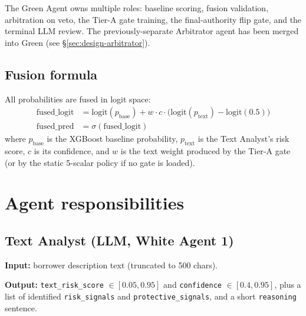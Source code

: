 \documentclass[11pt,a4paper]{article}
\begin{document}
\noindent
The Green Agent owns multiple roles: baseline scoring, fusion validation,
arbitration on veto, the Tier-A gate training, the final-authority flip gate,
and the terminal LLM review. The previously-separate Arbitrator agent has been
merged into Green (see \S\ref{sec:design-arbitrator}).

\subsection{Fusion formula}

All probabilities are fused in logit space:
\begin{align*}
\mathrm{fused\_logit} &= \mathrm{logit}(p_{\mathrm{base}})
                       + w \cdot c \cdot \bigl(\mathrm{logit}(p_{\mathrm{text}}) - \mathrm{logit}(0.5)\bigr) \\
\mathrm{fused\_pred}  &= \sigma(\mathrm{fused\_logit})
\end{align*}
where $p_{\mathrm{base}}$ is the XGBoost baseline probability, $p_{\mathrm{text}}$
is the Text Analyst's risk score, $c$ is its confidence, and $w$ is the text weight
produced by the Tier-A gate (or by the static 5-scalar policy if no gate is loaded).

\section{Agent responsibilities}
\label{sec:agents}

\subsection{Text Analyst (LLM, White Agent 1)}

\textbf{Input:} borrower description text (truncated to 500 chars).

\noindent
\textbf{Output:} \texttt{text\_risk\_score} $\in[0.05, 0.95]$ and
\texttt{confidence} $\in[0.4, 0.95]$, plus a list of identified
\texttt{risk\_signals} and \texttt{protective\_signals}, and a short
\texttt{reasoning} sentence.
\end{document}
